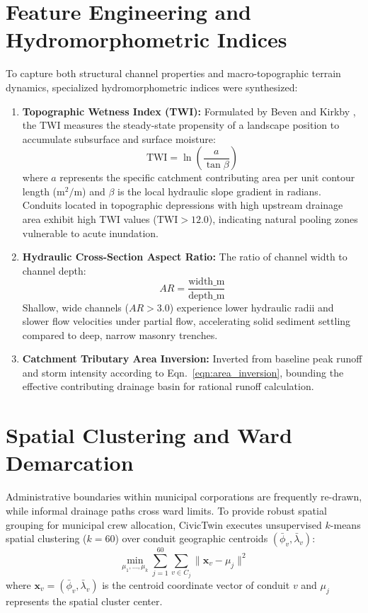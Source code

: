 \documentclass[12pt,a4paper]{report}
\begin{document}
\section{Feature Engineering and Hydromorphometric Indices}
To capture both structural channel properties and macro-topographic terrain dynamics, specialized hydromorphometric indices were synthesized:
\begin{enumerate}
    \item \textbf{Topographic Wetness Index (TWI):} Formulated by Beven and Kirkby \cite{beven1979physically}, the TWI measures the steady-state propensity of a landscape position to accumulate subsurface and surface moisture:
    \begin{equation}
    \text{TWI} = \ln\left(\frac{a}{\tan \beta}\right)
    \label{eqn:twi_formula}
    \end{equation}
    where $a$ represents the specific catchment contributing area per unit contour length ($\text{m}^2/\text{m}$) and $\beta$ is the local hydraulic slope gradient in radians. Conduits located in topographic depressions with high upstream drainage area exhibit high TWI values ($\text{TWI} > 12.0$), indicating natural pooling zones vulnerable to acute inundation.
    \item \textbf{Hydraulic Cross-Section Aspect Ratio:} The ratio of channel width to channel depth:
    \begin{equation}
    AR = \frac{\text{width\_m}}{\text{depth\_m}}
    \label{eqn:aspect_ratio}
    \end{equation}
    Shallow, wide channels ($AR > 3.0$) experience lower hydraulic radii and slower flow velocities under partial flow, accelerating solid sediment settling compared to deep, narrow masonry trenches.
    \item \textbf{Catchment Tributary Area Inversion:} Inverted from baseline peak runoff and storm intensity according to Eqn.~\ref{eqn:area_inversion}, bounding the effective contributing drainage basin for rational runoff calculation.
\end{enumerate}

\section{Spatial Clustering and Ward Demarcation}
Administrative boundaries within municipal corporations are frequently re-drawn, while informal drainage paths cross ward limits. To provide robust spatial grouping for municipal crew allocation, CivicTwin executes unsupervised $k$-means spatial clustering ($k = 60$) over conduit geographic centroids $(\bar{\phi}_v, \bar{\lambda}_v)$:
\begin{equation}
\min_{\mu_1, \dots, \mu_k} \sum_{j=1}^{60} \sum_{v \in C_j} \|\mathbf{x}_v - \mu_j\|^2
\label{eqn:kmeans_clustering}
\end{equation}
where $\mathbf{x}_v = (\bar{\phi}_v, \bar{\lambda}_v)$ is the centroid coordinate vector of conduit $v$ and $\mu_j$ represents the spatial cluster center. 
\end{document}
